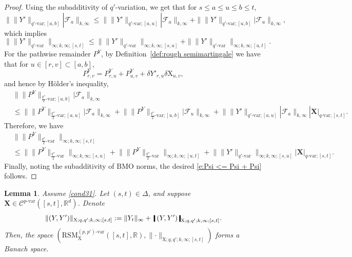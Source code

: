 \documentclass[11pt,reqno]{amsart}
\newtheorem{lemma}{Lemma}[section]
\numberwithin{equation}{section}
\def\R{\mathbb R}
\newcommand{\shortthickbar}{%
  \vcenter{\hbox{\rule{1.8pt}{2.2ex}}}%
}
\newcommand{\thicknm}[1]{%
  \mathopen{\shortthickbar}%
  \mkern4mu #1 \mkern4mu%
  \mathclose{\shortthickbar}%
}
\begin{document}
\begin{proof}
Using the subadditivity of $q'$-variation, we get that for $s \le a\le u \le b \le t$,
\begin{equation*}
\| \|Y'\|_{q'\text{-}\mathrm{var};[a,b]} | \mathcal F_{a} \|_{k,\infty} \le \| \|Y'\|_{q'\text{-}\mathrm{var};[a,u]} | \mathcal F_{a} \|_{k,\infty} + \| \|Y'\|_{q'\text{-}\mathrm{var};[u,b]} | \mathcal F_{u} \|_{k,\infty},
\end{equation*}
which implies  $$\| \|Y'\|_{q'\text{-}\mathrm{var}} \|_{\infty;k,\infty;[s,t]} \le \| \|Y'\|_{q'\text{-}\mathrm{var}} \|_{\infty;k,\infty;[s,u]} + \| \|Y'\|_{q'\text{-}\mathrm{var}} \|_{\infty;k,\infty;[u,t]}.$$
For the pathwise remainder $P^Y$, by Definition~\ref{def:rough semimartingale} we have that for $u\in[r,v] \subset [a,b]$,
\begin{equation*}
P^Y_{r,v} = P^Y_{r,u} + P^Y_{u, v} + \delta Y'_{r,u} \delta \mathrm X_{u, v},
\end{equation*}
and hence by H\"older's inequality, 
\begin{equation*}
\begin{aligned}
&\big\| \|P^Y\|_{\frac{q''}{2}\text{-}\mathrm{var};[a,b]} \big| \mathcal F_{a} \big\|_{k,\infty} \\
&\le \big\| \|P^Y\|_{\frac{q''}{2}\text{-}\mathrm{var};[a,u]} \big|\mathcal F_a \big\|_{k,\infty} + \big\| \|P^Y\|_{\frac{q''}{2}\text{-}\mathrm{var};[u,b]} \big| \mathcal F_u \big\|_{k,\infty}  + \big\| \| Y'\|_{q'\text{-}\mathrm{var};[a,u]}  | \mathcal F_{a} \big\|_{k,\infty} |\mathbf X|_{q\text{-}\mathrm{var};[s,t]}.
\end{aligned}
\end{equation*}
Therefore, we have
\begin{equation*}
\begin{aligned}
&\big\| \| P^Y\|_{\frac{q''}{2}\text{-}\mathrm{var}} \big\|_{\infty;k,\infty;[s,t]} \\
&\le \big\| \|P^Y\|_{\frac{q''}{2}\text{-}\mathrm{var}} \big\|_{\infty;k,\infty;[s,u]} + \big\| \|P^Y\|_{\frac{q''}{2}\text{-}\mathrm{var}} \big\|_{\infty;k,\infty;[u,t]} + \big\| \|Y'\|_{q'\text{-}\mathrm{var}} \big\|_{\infty;k,\infty;[s,u]} |\mathbf X|_{q\text{-}\mathrm{var};[s,t]}.
\end{aligned}
\end{equation*}
Finally, noting the subadditivity of BMO norms, the desired \eqref{e:Psi <= Psi + Psi} follows.
\end{proof}

\begin{lemma}\label{lem:Banach property of RSMs}
Assume \eqref{cond31}. Let $(s,t) \in \Delta$, and suppose $\mathbf X \in \mathscr C^{p\text{-}\mathrm{var}}([s,t],\R^d)$. Denote 
\begin{equation*}
\|(Y,Y')\|_{\mathrm X;q,q';k,\infty;[s,t]} := \|Y_{t}\|_{\infty} +\, \thicknm{(Y,Y')}_{\mathrm X;q,q';k,\infty;[s,t]}.
\end{equation*}
Then, the space $(\mathrm{RSM}^{(p,p')\text{-}\mathrm{var}}_{\mathrm X}([s,t],\R), \|\bm\cdot\|_{\mathrm X;q,q';k,\infty;[s,t]})$ forms a Banach space. 
\end{lemma}
\end{document}
